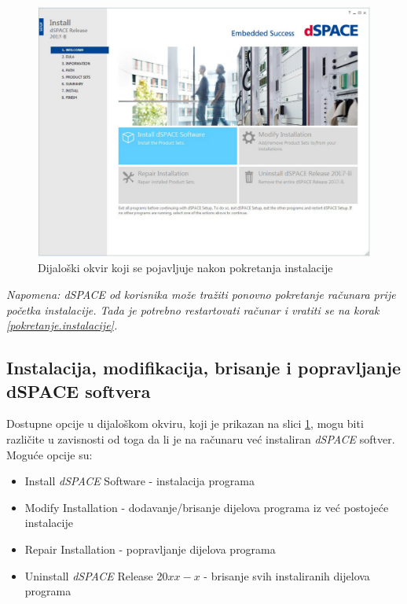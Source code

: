 \begin{figure}[h]
\begin{center}
\includegraphics[width=\textwidth]{slike/dSpace/welcome.png}
\end{center}
\caption{Dijaloški okvir koji se pojavljuje nakon pokretanja instalacije \cite{dSPACEinstall}}
\label{fig:welcome}
\end{figure}

\textit{Napomena: \textit{dSPACE} od korisnika može tražiti ponovno pokretanje računara prije početka instalacije. Tada je potrebno \textit{restartovati} računar i vratiti se na korak \ref{pokretanje.instalacije}.}

\subsection{Instalacija, modifikacija, brisanje i popravljanje dSPACE softvera}

\qquad Dostupne opcije u dijaloškom okviru, koji je prikazan na slici \ref{fig:welcome}, mogu biti različite u zavisnosti od toga da li je na računaru već instaliran \textit{dSPACE} softver. Moguće opcije su:

\begin{itemize}
	\item Install \textit{dSPACE} Software - instalacija programa
	\item Modify Installation - dodavanje/brisanje dijelova programa iz već postojeće instalacije
	\item Repair Installation - popravljanje dijelova programa
	\item Uninstall \textit{dSPACE} Release 20$xx-x$ - brisanje svih instaliranih dijelova programa
\end{itemize}

